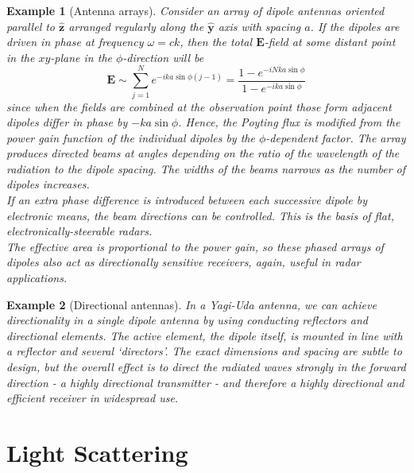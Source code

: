 \documentclass[a4paper]{article}
\newtheorem{eg}{Example}[section]
\theoremstyle{new}
\begin{document}
\begin{eg}[Antenna arrays]
Consider an array of dipole antennas oriented parallel to $\mathbf{\hat{z}}$ arranged regularly along the $\mathbf{\hat{y}}$ axis with spacing $a$. If the dipoles are driven in phase at frequency $\omega=ck$, then the total $\mathbf{E}$-field at some distant point in the $xy$-plane in the $\phi$-direction will be
$$\mathbf{E}\sim\sum_{j=1}^Ne^{-ika\sin\phi(j-1)}=\frac{1-e^{-iNka\sin\phi}}{1-e^{-ika\sin\phi}}$$
since when the fields are combined at the observation point those form adjacent dipoles differ in phase by $-ka\sin\phi$. Hence, the Poyting flux is modified from the power gain function of the individual dipoles by the $\phi$-dependent factor. The array produces directed beams at angles depending on the ratio of the wavelength of the radiation to the dipole spacing. The widths of the beams narrows as the number of dipoles increases.\\[5pt]
If an extra phase difference is introduced between each successive dipole by electronic means, the beam directions can be controlled. This is the basis of flat, electronically-steerable radars.\\[5pt]
The effective area is proportional to the power gain, so these phased arrays of dipoles also act as directionally sensitive receivers, again, useful in radar applications.
\end{eg}
\begin{eg}[Directional antennas]
In a Yagi-Uda antenna, we can achieve directionality in a single dipole antenna by using conducting reflectors and directional elements. The active element, the dipole itself, is mounted in line with a reflector and several `directors'. The exact dimensions and spacing are subtle to design, but the overall effect is to direct the radiated waves strongly in the forward direction - a highly directional transmitter - and therefore a highly directional and efficient receiver in widespread use.
\end{eg} 
\newpage
\section{Light Scattering}
\end{document}
